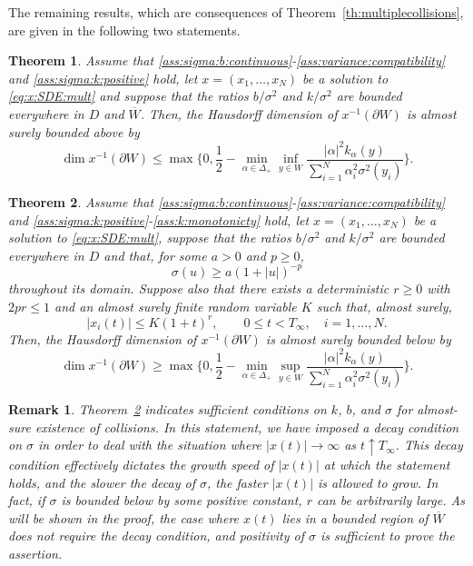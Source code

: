 \documentclass{article}
\numberwithin{equation}{section}
\newcommand{\Cc}{\overline{W}}
\newcommand{\Sni}{\sum_{i=1}^N}
\newcommand{\domain}{D}
\newcommand{\SimplePlus}{\Delta_+}
\theoremstyle{plain}
\newtheorem{theorem}{Theorem}
\newtheorem{remark}{Remark}
\begin{document}
The remaining results, which are consequences of Theorem~\ref{th:multiplecollisions}, are given in the following two statements.
\begin{theorem}
    Assume that \ref{ass:sigma:b:continuous}-\ref{ass:variance:compatibility} and \ref{ass:sigma:k:positive} hold, let $x=(x_1,\dots,x_N)$ be a solution to \eqref{eq:x:SDE:mult} and suppose that the ratios $b/\sigma^2$ and $k/\sigma^2$ are bounded everywhere in $\domain$ and $\Cc$. Then, the Hausdorff dimension of $x^{-1}(\partial W)$ is almost surely bounded above by
    \[\dim x^{-1}(\partial W)\leq \max\bigg\{0,\frac12-\min_{ {\alpha\in\SimplePlus}}\inf_{y\in W}\frac{|\alpha|^2k_\alpha(y)}{\Sni\alpha_i^2\sigma^2(y_i)}\bigg\}.\]
    \label{th:Hausdorffupper}
\end{theorem}
\begin{theorem}
    Assume that \ref{ass:sigma:b:continuous}-\ref{ass:variance:compatibility} and \ref{ass:sigma:k:positive}-\ref{ass:k:monotonicty} hold, let $x=(x_1,\dots,x_N)$ be a solution to \eqref{eq:x:SDE:mult}, suppose that the ratios $b/\sigma^2$ and $k/\sigma^2$ are bounded everywhere in $\domain$ and that, for some $a>0$ and $p\geq0$,
    \[
        \sigma(u)\geq a(1+|u|)^{-p}
    \]
    throughout its domain.
    Suppose also that there exists a deterministic $r\geq0$
with $2pr\leq1$ and an almost surely finite random variable
$K$ such that, almost surely,
    \begin{equation*}
        |x_i(t)|\leq K(1+t)^r, \qquad 0\leq t<T_\infty,\quad i=1,\ldots,N.
    \end{equation*}
    Then, the Hausdorff dimension of $x^{-1}(\partial W)$ is almost surely bounded below by
        \[\dim x^{-1}(\partial W)\geq \max \bigg\{0,\frac12 - \min_{\alpha\in \Delta_+}\sup_{y\in W}\frac{|\alpha|^2k_\alpha(y)}{\Sni\alpha_i^2\sigma^2(y_i)}\bigg\}.\]
    \label{th:Hausdorfflower}
\end{theorem}
\begin{remark}
Theorem~\ref{th:Hausdorfflower} indicates sufficient conditions on $k$, $b$, and $\sigma$ for almost-sure existence of collisions. In this statement, we have imposed a decay condition on $\sigma$ in order to deal with the situation where $|x(t)|\to\infty$ as $t\uparrow T_\infty$. This decay condition effectively dictates the growth speed of $|x(t)|$ at which the statement holds, and the slower the decay of $\sigma$, the faster $|x(t)|$ is allowed to grow. In fact, if $\sigma$ is bounded below by some positive constant, $r$ can be arbitrarily large. As will be shown in the proof, the case where $x(t)$ lies in a bounded region of $\Cc$ does not require the decay condition, and positivity of $\sigma$ is sufficient to prove the assertion. 
\end{remark}
\end{document}
